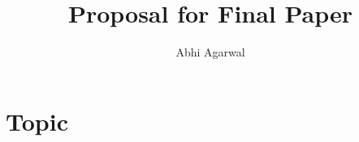 \documentclass[11pt, oneside]{article}
\title{Proposal for Final Paper}
\author{Abhi Agarwal}
\date{}
\begin{document}
\maketitle
\section{Topic}
\par 

\end{document}
